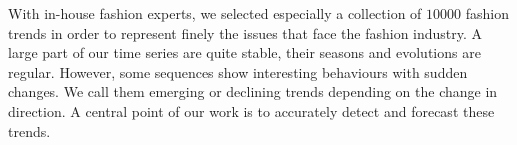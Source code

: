 \documentclass{article} %
\newcommand{\numberts}{10000}
\begin{document}
With in-house fashion experts, we selected especially a collection of $\numberts$ fashion trends in order to represent finely the issues that face the fashion industry. A large part of our time series are quite stable, their seasons and evolutions are regular. However, some sequences show interesting behaviours with sudden changes. We call them emerging or declining trends depending on the change in direction. A central point of our work is to accurately detect and forecast these trends.






\end{document}
